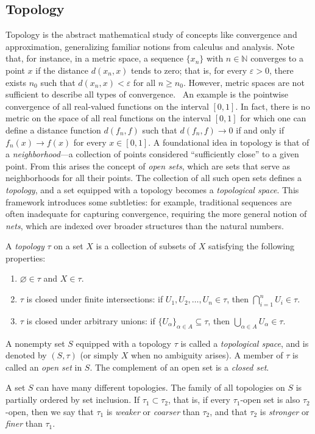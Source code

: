 \subsection{Topology}
Topology is the abstract mathematical study of concepts like convergence and approximation, generalizing familiar notions from calculus and analysis. 
Note that, for instance, in a metric space, a sequence $\{x_n\}$ with $n \in \mathbb{N}$ converges to a point $x$ if the distance $d(x_n, x)$ tends to zero; that is, for every $\varepsilon > 0$, there exists $n_0$ such that $d(x_n, x) < \varepsilon$ for all $n \geq n_0$. However, metric spaces are not sufficient to describe all types of convergence.  An example is the pointwise convergence of all real-valued functions on the interval $[0, 1]$. In fact, there is no metric on the space of all real functions on the interval $[0,1]$ for which one can define a distance function $d(f_n, f)$ such that $d(f_n, f) \to 0$ if and only if $f_n(x) \to f(x)$ for every $x \in [0, 1]$. 
A foundational idea in topology is that of a \emph{neighborhood}—a collection of points considered ``sufficiently close'' to a given point. From this arises the concept of \emph{open sets}, which are sets that serve as neighborhoods for all their points. The collection of all such open sets defines a \emph{topology}, and a set equipped with a topology becomes a \emph{topological space}. This framework introduces some subtleties: for example, traditional sequences are often inadequate for capturing convergence, requiring the more general notion of \emph{nets}, which are indexed over broader structures than the natural numbers.

\begin{definition}
  A \emph{topology} $\tau$ on a set $X$ is a collection of subsets of $X$ satisfying the following properties:
\begin{enumerate}
    \item $\varnothing \in \tau$ and $X \in \tau$.
    \item $\tau$ is closed under finite intersections: if $U_1, U_2, \dots, U_n \in \tau$, then $\bigcap_{i=1}^n U_i \in \tau$.
    \item $\tau$ is closed under arbitrary unions: if $\{U_\alpha\}_{\alpha \in A} \subseteq \tau$, then $\bigcup_{\alpha \in A} U_\alpha \in \tau$.
\end{enumerate}

A nonempty set $S$ equipped with a topology $\tau$ is called a \emph{topological space}, and is denoted by $(S, \tau)$ (or simply $X$ when no ambiguity arises). A member of $\tau$ is called an \emph{open set} in $S$. The complement of an open set is a \emph{closed set}. 

A set \( S \) can have many different topologies.  
The family of all topologies on \( S \) is partially ordered by set inclusion.  
If \( \tau_1 \subset \tau_2 \), that is, if every \( \tau_1 \)-open set is also \( \tau_2 \)-open,  
then we say that \( \tau_1 \) is \emph{weaker} or \emph{coarser} than \( \tau_2 \),  
and that \( \tau_2 \) is \emph{stronger} or \emph{finer} than \( \tau_1 \).
\end{definition}

